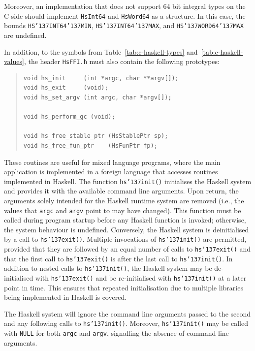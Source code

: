 Moreover, an implementation that does not support 64 bit integral types on the
C side should implement \mbox{\tt HsInt64} and \mbox{\tt HsWord64} as a structure.  In
this case, the bounds \mbox{\tt HS{\char'137}INT64{\char'137}MIN}, \mbox{\tt HS{\char'137}INT64{\char'137}MAX}, and
\mbox{\tt HS{\char'137}WORD64{\char'137}MAX} are undefined.

In addition, to the symbols from Table~\ref{tab:c-haskell-types}
and~\ref{tab:c-haskell-values}, the header \mbox{\tt HsFFI.h} must also contain
the following prototypes:
%
\begin{quote}
\begin{verbatim}
void hs_init     (int *argc, char **argv[]);
void hs_exit     (void);
void hs_set_argv (int argc, char *argv[]);

void hs_perform_gc (void);

void hs_free_stable_ptr (HsStablePtr sp);
void hs_free_fun_ptr    (HsFunPtr fp);
\end{verbatim}
\end{quote}
%
These routines are useful for mixed language programs, where the main
application is implemented in a foreign language that accesses routines
implemented in Haskell.  The function \mbox{\tt hs{\char'137}init()} initialises the
Haskell system and provides it with the available command line arguments.
Upon return, the arguments solely intended for the Haskell runtime system are
removed (i.e., the values that \mbox{\tt argc} and \mbox{\tt argv} point to may have
changed).  This function must be called during program startup before any
Haskell function is invoked; otherwise, the system behaviour is undefined.
Conversely, the Haskell system is deinitialised by a call to
\mbox{\tt hs{\char'137}exit()}.  Multiple invocations of \mbox{\tt hs{\char'137}init()} are permitted,
provided that they are followed by an equal number of calls to
\mbox{\tt hs{\char'137}exit()} and that the first call to \mbox{\tt hs{\char'137}exit()} is after the
last call to \mbox{\tt hs{\char'137}init()}.  In addition to nested calls to
\mbox{\tt hs{\char'137}init()}, the Haskell system may be de-initialised with
\mbox{\tt hs{\char'137}exit()} and be re-initialised with \mbox{\tt hs{\char'137}init()} at a later
point in time.  This ensures that repeated initialisation due to multiple
libraries being implemented in Haskell is covered.

The Haskell system will ignore the command line arguments passed to the second
and any following calls to \mbox{\tt hs{\char'137}init()}.  Moreover, \mbox{\tt hs{\char'137}init()} may
be called with \mbox{\tt NULL} for both \mbox{\tt argc} and \mbox{\tt argv}, signalling
the absence of command line arguments.

